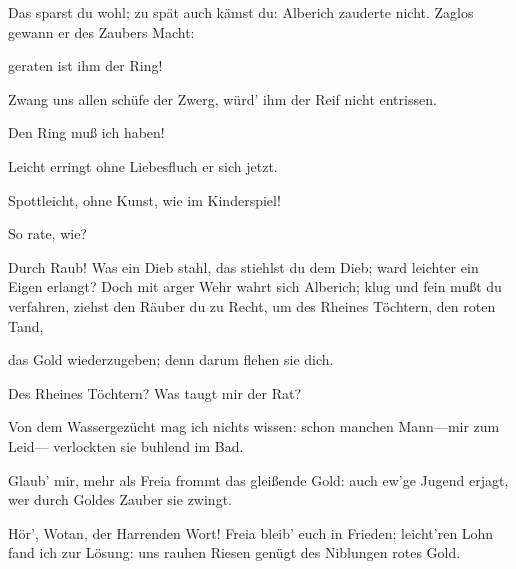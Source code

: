 \begin{drama}
Das sparst du wohl; zu spät auch kämst du:
Alberich zauderte nicht.
Zaglos gewann er des Zaubers Macht:
 



geraten ist ihm der Ring!
 

\Donnerspeaks


Zwang uns allen schüfe der Zwerg,
würd' ihm der Reif nicht entrissen.
 

\Wotanspeaks
Den Ring muß ich haben!
 

\Frohspeaks
Leicht erringt ohne Liebesfluch er sich jetzt.
 

\Logespeaks
Spottleicht, ohne Kunst, wie im Kinderspiel!
 

\Wotanspeaks


So rate, wie?
 

\Logespeaks
Durch Raub!
Was ein Dieb stahl, das stiehlst du dem Dieb;
ward leichter ein Eigen erlangt?
Doch mit arger Wehr wahrt sich Alberich;
klug und fein mußt du verfahren,
ziehst den Räuber du zu Recht,
um des Rheines Töchtern, den roten Tand,
 



das Gold wiederzugeben;
denn darum flehen sie dich.
 

\Wotanspeaks
Des Rheines Töchtern? Was taugt mir der Rat?
 

\Frickaspeaks
Von dem Wassergezücht mag ich nichts wissen:
schon manchen Mann---mir zum Leid---
verlockten sie buhlend im Bad.
 




\Fafnerspeaks


Glaub' mir, mehr als Freia
frommt das gleißende Gold:
auch ew'ge Jugend erjagt,
wer durch Goldes Zauber sie zwingt.
 



Hör', Wotan, der Harrenden Wort!
Freia bleib' euch in Frieden;
leicht'ren Lohn fand ich zur Lösung:
uns rauhen Riesen genügt
des Niblungen rotes Gold.
 


\end{drama}
